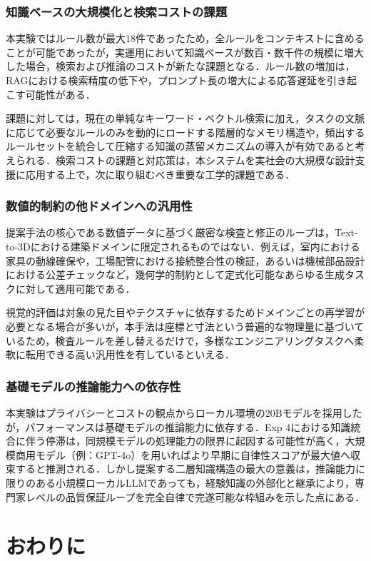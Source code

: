 \documentclass[dvipdfmx, a4paper, 9pt]{deimj}
\begin{document}
\subsubsection{知識ベースの大規模化と検索コストの課題}
本実験ではルール数が最大18件であったため，全ルールをコンテキストに含めることが可能であったが，実運用において知識ベースが数百・数千件の規模に増大した場合，検索および推論のコストが新たな課題となる．ルール数の増加は，RAGにおける検索精度の低下や，プロンプト長の増大による応答遅延を引き起こす可能性がある．

課題に対しては，現在の単純なキーワード・ベクトル検索に加え，タスクの文脈に応じて必要なルールのみを動的にロードする階層的なメモリ構造や，頻出するルールセットを統合して圧縮する知識の蒸留メカニズムの導入が有効であると考えられる．検索コストの課題と対応策は，本システムを実社会の大規模な設計支援に応用する上で，次に取り組むべき重要な工学的課題である．

\subsubsection{数値的制約の他ドメインへの汎用性}
提案手法の核心である数値データに基づく厳密な検査と修正のループは，Text-to-3Dにおける建築ドメインに限定されるものではない．例えば，室内における家具の動線確保や，工場配管における接続整合性の検証，あるいは機械部品設計における公差チェックなど，幾何学的制約として定式化可能なあらゆる生成タスクに対して適用可能である．

視覚的評価は対象の見た目やテクスチャに依存するためドメインごとの再学習が必要となる場合が多いが，本手法は座標と寸法という普遍的な物理量に基づいているため，検査ルールを差し替えるだけで，多様なエンジニアリングタスクへ柔軟に転用できる高い汎用性を有しているといえる．

\subsubsection{基礎モデルの推論能力への依存性}
本実験はプライバシーとコストの観点からローカル環境の20Bモデルを採用したが，パフォーマンスは基礎モデルの推論能力に依存する．Exp 4における知識統合に伴う停滞は，同規模モデルの処理能力の限界に起因する可能性が高く，大規模商用モデル（例：GPT-4o）を用いればより早期に自律性スコアが最大値へ収束すると推測される．しかし提案する二層知識構造の最大の意義は，推論能力に限りのある小規模ローカルLLMであっても，経験知識の外部化と継承により，専門家レベルの品質保証ループを完全自律で完遂可能な枠組みを示した点にある．
\section{おわりに}
\end{document}
